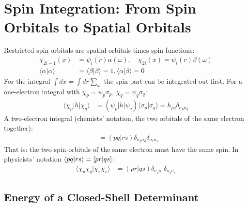 \section{Spin Integration: From Spin Orbitals to Spatial Orbitals}

Restricted spin orbitals are spatial orbitals times spin functions:
\begin{align*}
\chi_{2i-1}(x) &= \psi_i(r) \alpha(\omega), \quad \chi_{2i}(x) = \psi_i(r) \beta(\omega) \\
\langle \alpha|\alpha\rangle &= \langle \beta|\beta\rangle = 1, \langle \alpha|\beta\rangle = 0
\end{align*}
For the integral $\int dx = \int dr \sum_{\omega}$ the spin part can be integrated out first. For a one-electron integral with $\chi_p = \psi_p \sigma_p$, $\chi_q = \psi_q \sigma_q$:
\begin{align*}
\langle \chi_p|h|\chi_q\rangle &= (\psi_p|h|\psi_q) \langle \sigma_p|\sigma_q\rangle = h_{pq} \delta_{\sigma_p \sigma_q}
\end{align*}
A two-electron integral (chemists' notation, the two orbitals of the same electron together):
\begin{align*}
[\chi_p \chi_q|\chi_r \chi_s] &= (pq|rs) \delta_{\sigma_p \sigma_q} \delta_{\sigma_r \sigma_s}
\end{align*}
That is: the two spin orbitals of the same electron must have the same spin. In physicists' notation $\langle pq\vert rs\rangle = [pr|qs]$:
\begin{align*}
\langle \chi_p \chi_q|\chi_r \chi_s\rangle &= (pr|qs) \delta_{\sigma_p \sigma_r} \delta_{\sigma_q \sigma_s}
\end{align*}

\subsection{Energy of a Closed-Shell Determinant}


